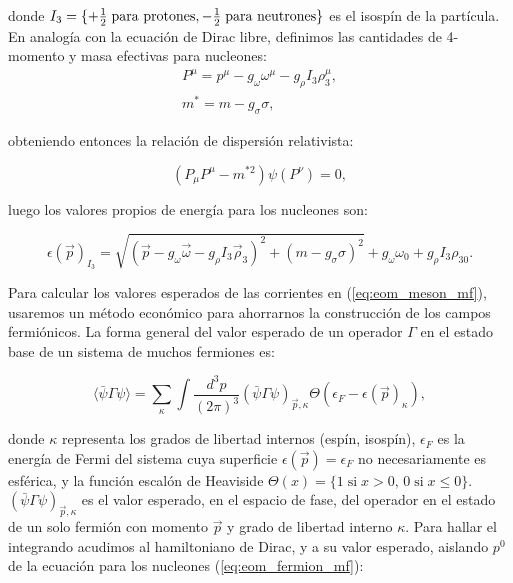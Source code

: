 donde $I_3 = \{+\tfrac{1}{2} \; \text{para protones}, -\tfrac{1}{2} \; \text{para neutrones}\}$ es el isospín de la partícula. En analogía con la ecuación de Dirac libre, definimos las cantidades de 4-momento y masa efectivas para nucleones:
\begin{equation}
	\begin{gathered}
		P^\mu = p^\mu - g_{\omega} \omega^\mu - g_{\rho} I_3 \rho_{3}^\mu,\\
		m^* = m - g_\sigma \sigma,
	\end{gathered}	
\end{equation}

obteniendo entonces la relación de dispersión relativista:

\begin{equation}
	\left(P_\mu P^\mu - m^{*2}\right)\psi(P^\nu) = 0,
\end{equation}

luego los valores propios de energía para los nucleones son:

\begin{equation}
	\epsilon(\Vec{p})_{I_3} = \sqrt{(\Vec{p}-g_\omega \Vec{\omega}-g_\rho I_3\Vec{\rho}_{3})^2+(m-g_\sigma\sigma)^2} + g_\omega\omega_0 + g_\rho I_3\rho_{30}.
	\label{eq:particleenergy} 
\end{equation}

Para calcular los valores esperados de las corrientes en (\ref{eq:eom_meson_mf}), usaremos un método económico para ahorrarnos la construcción de los campos fermiónicos. La forma general del valor esperado de un operador $\Gamma$ en el estado base de un sistema de muchos fermiones es:

\begin{equation}
	\langle \bar{\psi} \Gamma \psi \rangle = \sum_{\kappa}\int \frac{d^3p}{(2\pi)^3} (\bar{\psi} \Gamma \psi)_{\Vec{p},\kappa} \Theta(\epsilon_F - \epsilon(\Vec{p})_\kappa),
	\label{eq:valor_esperado_general}
\end{equation}

donde $\kappa$ representa los grados de libertad internos (espín, isospín), $\epsilon_F$ es la energía de Fermi del sistema cuya superficie $\epsilon(\Vec{p})=\epsilon_F$ no necesariamente es esférica, y la función escalón de Heaviside $\Theta(x) = \{1 \; \text{si} \; x > 0,\, 0 \; \text{si} \; x \leq 0\}$. $(\bar{\psi} \Gamma \psi)_{\Vec{p},\kappa}$ es el valor esperado, en el espacio de fase, del operador en el estado de un solo fermión con momento $\Vec{p}$ y grado de libertad interno $\kappa$. Para hallar el integrando acudimos al hamiltoniano de Dirac, y a su valor esperado, aislando $p^0$ de la ecuación para los nucleones (\ref{eq:eom_fermion_mf}):

